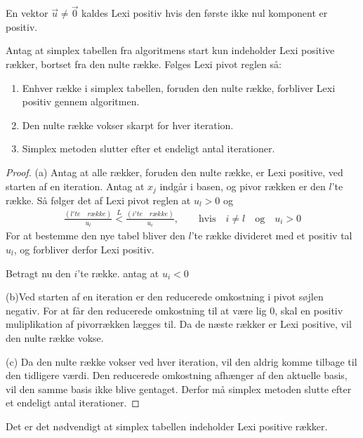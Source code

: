 \begin{defn}
En vektor $\vec{u} \neq \vec{0}$ kaldes Lexi positiv hvis den første ikke nul komponent er positiv. 
\end{defn}

 
\begin{stn}
Antag at simplex tabellen fra algoritmens start kun indeholder Lexi positive rækker, bortset fra den nulte række. Følges Lexi pivot reglen så: 
\begin{enumerate}[label=(\alph*)]
\item Enhver række i simplex tabellen, foruden den nulte række, forbliver Lexi positiv gennem algoritmen. 
\item Den nulte række vokser skarpt for hver iteration. 
\item Simplex metoden slutter efter et endeligt antal iterationer. 
\end{enumerate}
\label{stn:lexi}
\end{stn}

\begin{proof}
(a) Antag at alle rækker, foruden den nulte række, er Lexi positive, ved starten af en iteration. Antag at $x_j$ indgår i basen, og pivor rækken er den $l$'te række. Så følger det af Lexi pivot reglen at $u_l>0$ og
\begin{align}
\frac{(l'te \quad række)}{u_l} \overset{L}{<} \frac{(i'te \quad række)}{u_i}, \quad \quad \text{hvis} \quad  i \neq l \quad \text{og} \quad u_i>0
\end{align}
For at bestemme den nye tabel bliver den $l$'te række divideret med et positiv tal $u_l$, og forbliver derfor Lexi positiv. 

Betragt nu den $i$'te række. antag at $u_i<0$


(b)Ved starten af en iteration er den reducerede omkostning i pivot søjlen negativ. For at får den reducerede omkostning til at være lig $0$, skal en positiv muliplikation af pivorrækken lægges til. Da de næste rækker er Lexi positive, vil den nulte række vokse. 


(c) Da den nulte række vokser ved hver iteration, vil den aldrig komme tilbage til den tidligere værdi. Den reducerede omkostning afhænger af den aktuelle basis, vil den samme basis ikke blive gentaget. Derfor må simplex metoden slutte efter et endeligt antal iterationer. 
\end{proof}

Det er det nødvendigt at simplex tabellen indeholder Lexi positive rækker. 